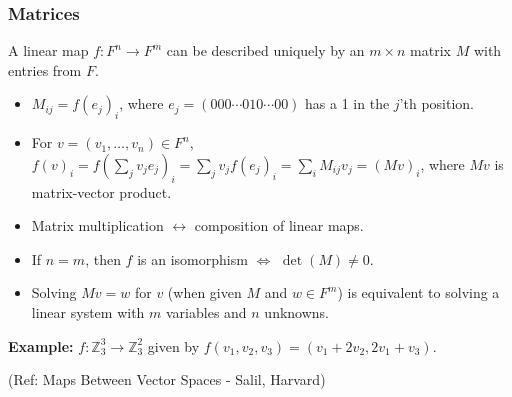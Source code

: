 \begin{frame}[fragile]
\frametitle{Matrices}

 A linear map $f : F^n \rightarrow F^m$ can be described uniquely by an $m\times n$ matrix $M$ with entries from $F$.
\begin{itemize}
\item $M_{ij} = f(e_j)_i$, where $e_j=(000\cdots 010\cdots 00)$ has a 1 in the $j$'th position.
\item For $v=(v_1,\ldots,v_n)\in F^n$, $f(v)_i = f(\sum_j v_je_j)_i = \sum_j v_jf(e_j)_i = \sum_i M_{ij}v_j = (Mv)_i$, where $Mv$ is matrix-vector product.
\item Matrix multiplication $\leftrightarrow$ composition of linear maps.
\item If $n=m$, then $f$ is an isomorphism $\Leftrightarrow$ $\det(M)\neq 0$.
\item Solving $Mv=w$ for $v$ (when given $M$ and $w\in F^m$) is equivalent to solving a linear system with $m$ variables and $n$ unknowns.
\end{itemize}

 \textbf{Example:} $f : {\mathbb Z}_3^3\rightarrow {\mathbb Z}_3^2$ given by $f(v_1,v_2,v_3)=(v_1+2v_2,2v_1+v_3)$.
 
 
\tiny{(Ref: Maps Between Vector Spaces - Salil, Harvard)}
\end{frame}




